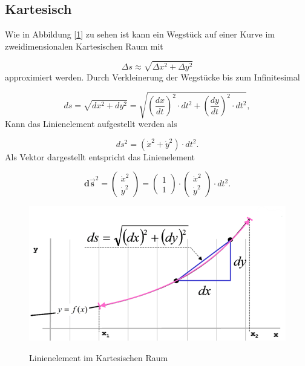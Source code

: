 %
%
%
%
\subsection{Kartesisch\label{geodaeten:section:LinKartesisch}}

Wie in Abbildung [\ref{geodaeten:Linienelemente:figure1}] zu sehen ist kann ein Wegstück auf einer Kurve im zweidimensionalen Kartesischen Raum mit

\begin{equation}
	\Delta s \approx \sqrt{\Delta x^2 + \Delta y^2}
\end{equation}
approximiert werden.
Durch Verkleinerung der Wegstücke bis zum Infinitesimal 

\begin{equation}
	d s = \sqrt{d x^2 + d y^2}
	= \sqrt{\left(\frac{d x}{d t}\right)^2 \cdot d t^2 + \left(\frac{d y}{d t}\right)^2 \cdot d t^2} ,
\end{equation}
Kann das Linienelement aufgestellt werden als

\begin{equation}
 	ds^2 = \left(\dot{x}^2 +\dot{y}^2\right) \cdot dt^2 .
\end{equation}
Als Vektor dargestellt entspricht das Linienelement

\begin{equation}
	\mathbf{d\vec{s}}^2 = \begin{pmatrix} \dot{x}^2 \\ \dot{y}^2 \end{pmatrix} = \begin{pmatrix} 1 \\ 1 \end{pmatrix} \cdot \begin{pmatrix} \dot{x}^2 \\ \dot{y}^2 \end{pmatrix} \cdot dt^2 .
\end{equation}

\begin{figure}
	\centering
	\includegraphics[width=0.7\linewidth]{papers/geodaeten/Abbildungen/Linienelemente/LinKartes1}
	\caption{Linienelement im Kartesischen Raum}
	\label{geodaeten:Linienelemente:figure1}
	\cite{geodaeten:kartesisch}
\end{figure}
